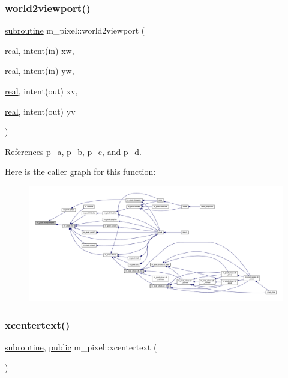 \subsubsection{\texorpdfstring{world2viewport()}{world2viewport()}}
{\footnotesize\ttfamily \hyperlink{M__stopwatch_83_8txt_acfbcff50169d691ff02d4a123ed70482}{subroutine} m\+\_\+pixel\+::world2viewport (\begin{DoxyParamCaption}\item[{\hyperlink{read__watch_83_8txt_abdb62bde002f38ef75f810d3a905a823}{real}, intent(\hyperlink{M__journal_83_8txt_afce72651d1eed785a2132bee863b2f38}{in})}]{xw,  }\item[{\hyperlink{read__watch_83_8txt_abdb62bde002f38ef75f810d3a905a823}{real}, intent(\hyperlink{M__journal_83_8txt_afce72651d1eed785a2132bee863b2f38}{in})}]{yw,  }\item[{\hyperlink{read__watch_83_8txt_abdb62bde002f38ef75f810d3a905a823}{real}, intent(out)}]{xv,  }\item[{\hyperlink{read__watch_83_8txt_abdb62bde002f38ef75f810d3a905a823}{real}, intent(out)}]{yv }\end{DoxyParamCaption})}



References p\+\_\+a, p\+\_\+b, p\+\_\+c, and p\+\_\+d.

Here is the caller graph for this function\+:
\nopagebreak
\begin{figure}[H]
\begin{center}
\leavevmode
\includegraphics[width=350pt]{namespacem__pixel_a9d4aea8ae2eb15317b83fa03a11371b2_icgraph}
\end{center}
\end{figure}
\mbox{\label{namespacem__pixel_a1e0c43d36b35eafea921f91c31d8a478}} 
\subsubsection{\texorpdfstring{xcentertext()}{xcentertext()}}
{\footnotesize\ttfamily \hyperlink{M__stopwatch_83_8txt_acfbcff50169d691ff02d4a123ed70482}{subroutine}, \hyperlink{M__stopwatch_83_8txt_a2f74811300c361e53b430611a7d1769f}{public} m\+\_\+pixel\+::xcentertext (\begin{DoxyParamCaption}{ }\end{DoxyParamCaption})}



